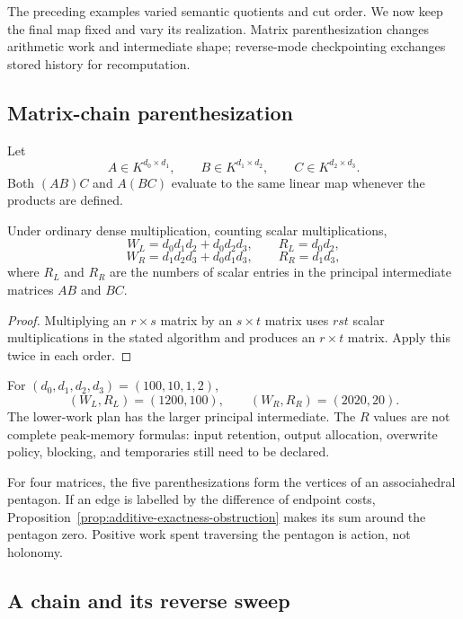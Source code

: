 The preceding examples varied semantic quotients and cut order.  We now keep
the final map fixed and vary its realization.  Matrix parenthesization changes
arithmetic work and intermediate shape; reverse-mode checkpointing exchanges
stored history for recomputation.

\subsection{Matrix-chain parenthesization}

Let
\[
  A\in K^{d_0\times d_1},
  \qquad B\in K^{d_1\times d_2},
  \qquad C\in K^{d_2\times d_3}.
\]
Both $(AB)C$ and $A(BC)$ evaluate to the same linear map whenever the products
are defined.

\begin{proposition}
\label{prop:matrix-chain-costs}
Under ordinary dense multiplication, counting scalar multiplications,
\[
  W_L=d_0d_1d_2+d_0d_2d_3,
  \qquad
  R_L=d_0d_2,
\]
\[
  W_R=d_1d_2d_3+d_0d_1d_3,
  \qquad
  R_R=d_1d_3,
\]
where $R_L$ and $R_R$ are the numbers of scalar entries in the principal
intermediate matrices $AB$ and $BC$.
\end{proposition}

\begin{proof}
Multiplying an $r\times s$ matrix by an $s\times t$ matrix uses $rst$ scalar
multiplications in the stated algorithm and produces an $r\times t$ matrix.
Apply this twice in each order.
\end{proof}

For $(d_0,d_1,d_2,d_3)=(100,10,1,2)$,
\[
  (W_L,R_L)=(1200,100),
  \qquad
  (W_R,R_R)=(2020,20).
\]
The lower-work plan has the larger principal intermediate.  The $R$ values are
not complete peak-memory formulas: input retention, output allocation,
overwrite policy, blocking, and temporaries still need to be declared.

For four matrices, the five parenthesizations form the vertices of an
associahedral pentagon.  If an edge is labelled by the difference of endpoint
costs, Proposition~\ref{prop:additive-exactness-obstruction} makes its sum around
the pentagon zero.  Positive work spent traversing the pentagon is action, not
holonomy.

\subsection{A chain and its reverse sweep}

